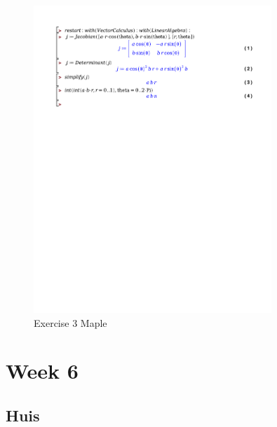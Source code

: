 \documentclass[a4paper]{report}
\begin{document}
\begin{figure}[H]
	\centering
	\includegraphics[width=0.8\textwidth]{exercises/wc_5_ex_3.pdf}
	\caption{Exercise 3 Maple}
	\label{fig:wc_5_ex_3_maple}
\end{figure}



\section{Week 6}

\subsection{Huis}
\end{document}

